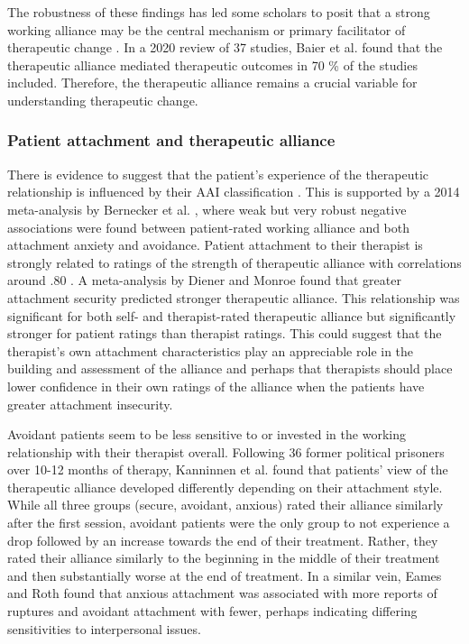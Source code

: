 \documentclass[12pt]{report}
\begin{document}
The robustness of these findings has led some scholars to posit that a strong working alliance may be the central mechanism or primary facilitator of therapeutic change \cite{RodgersCailholBuiEtAl2010}.
In a 2020 review of 37 studies, Baier et al. \citeyear{Baier2020} found that the therapeutic alliance mediated therapeutic outcomes in 70 \% of the studies included.
Therefore, the therapeutic alliance remains a crucial variable for understanding therapeutic change.

\subsubsection*{Patient attachment and therapeutic alliance}
There is evidence to suggest that the patient's experience of the therapeutic relationship is influenced by their AAI classification \cite{Talia2019}.
This is supported by a 2014 meta-analysis by Bernecker et al. \citeyear{Bernecker2014}, where weak but very robust negative associations were found between patient-rated working alliance and both attachment anxiety and avoidance.
Patient attachment to their therapist is strongly related to ratings of the strength of therapeutic alliance with correlations around .80 .
A meta-analysis by Diener and Monroe \citeyear{Diener2011} found that greater attachment security predicted stronger therapeutic alliance.
This relationship was significant for both self- and therapist-rated therapeutic alliance but significantly stronger for patient ratings than therapist ratings.
This could suggest that the therapist's own attachment characteristics play an appreciable role in the building and assessment of the alliance and perhaps that therapists should place lower confidence in their own ratings of the alliance when the patients have greater attachment insecurity.

Avoidant patients seem to be less sensitive to or invested in the working relationship with their therapist overall.
Following 36 former political prisoners over 10-12 months of therapy, Kanninnen et al. \citeyear{Kanninen2000} found that patients' view of the therapeutic alliance developed differently depending on their attachment style.
While all three groups (secure, avoidant, anxious) rated their alliance similarly after the first session, avoidant patients were the only group to not experience a drop followed by an increase towards the end of their treatment.
Rather, they rated their alliance similarly to the beginning in the middle of their treatment and then substantially worse at the end of treatment.
In a similar vein, Eames and Roth \citeyear{Eames2000} found that anxious attachment was associated with more reports of ruptures and avoidant attachment with fewer, perhaps indicating differing sensitivities to interpersonal issues.
\end{document}
